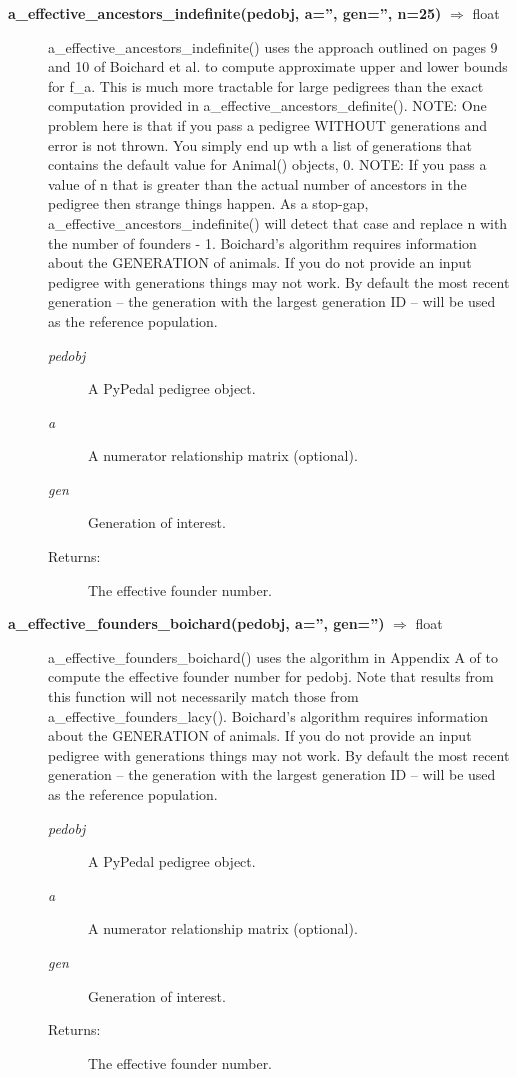 \begin{description}
\item[\textbf{a\_effective\_ancestors\_indefinite(pedobj, a='', gen='', n=25)} $\Rightarrow$ float]
a\_effective\_ancestors\_indefinite() uses the approach outlined on pages 9 and 10 of Boichard et al. \cite{ref352} to compute approximate upper and lower bounds for f\_a. This is much more tractable for large pedigrees than the exact computation provided in a\_effective\_ancestors\_definite(). NOTE: One problem here is that if you pass a pedigree WITHOUT generations and error is not thrown. You simply end up wth a list of generations that contains the default value for Animal() objects, 0. NOTE: If you pass a value of n that is greater than the actual number of ancestors in the pedigree then strange things happen. As a stop-gap, a\_effective\_ancestors\_indefinite() will detect that case and replace n with the number of founders - 1. Boichard's algorithm requires information about the GENERATION of animals. If you do not provide an input pedigree with generations things may not work. By default the most recent generation -- the generation with the largest generation ID -- will be used as the reference population.
\begin{description}
\item[\emph{pedobj}] A PyPedal pedigree object.
\item[\emph{a}] A numerator relationship matrix (optional).
\item[\emph{gen}] Generation of interest.
\item[Returns:] The effective founder number.
\end{description}

\item[\textbf{a\_effective\_founders\_boichard(pedobj, a='', gen='')} $\Rightarrow$ float]
a\_effective\_founders\_boichard() uses the algorithm in Appendix A of  to compute the effective founder number for pedobj. Note that results from this function will not necessarily match those from a\_effective\_founders\_lacy(). Boichard's algorithm requires information about the GENERATION of animals. If you do not provide an input pedigree with generations things may not work. By default the most recent generation -- the generation with the largest generation ID -- will be used as the reference population.
\begin{description}
\item[\emph{pedobj}] A PyPedal pedigree object.
\item[\emph{a}] A numerator relationship matrix (optional).
\item[\emph{gen}] Generation of interest.
\item[Returns:] The effective founder number.
\end{description}


\end{description}
